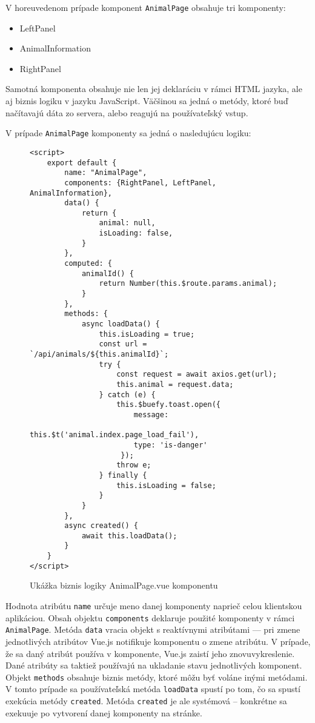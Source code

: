V horeuvedenom prípade komponent \texttt{AnimalPage} obsahuje tri komponenty:
\begin{itemize}
	\item LeftPanel
	\item AnimalInformation
	\item RightPanel
\end{itemize}

Samotná komponenta obsahuje nie len jej deklaráciu v rámci HTML jazyka, ale aj biznis logiku v jazyku JavaScript. Väčšinou sa jedná o metódy, ktoré buď načítavajú dáta zo servera, alebo reagujú na používateľský vstup.

V prípade \texttt{AnimalPage} komponenty sa jedná o nasledujúcu logiku:
\raggedbottom

\begin{figure}[H]
\begin{verbatim}
<script>
    export default {
        name: "AnimalPage",
        components: {RightPanel, LeftPanel, AnimalInformation},
        data() {
            return {
                animal: null,
                isLoading: false,
            }
        },
        computed: {
            animalId() {
                return Number(this.$route.params.animal);
            }
        },
        methods: {
            async loadData() {
                this.isLoading = true;
                const url = `/api/animals/${this.animalId}`;
                try {
                    const request = await axios.get(url);
                    this.animal = request.data;
                } catch (e) {
                    this.$buefy.toast.open({
                        message:
                        this.$t('animal.index.page_load_fail'),
                        type: 'is-danger' 
                     });
                    throw e;
                } finally {
                    this.isLoading = false;
                }
            }
        },
        async created() {
            await this.loadData();
        }
    }
</script>
\end{verbatim}
\caption[Ukážka biznis logiky AnimalPage.vue komponentu]
{Ukážka biznis logiky AnimalPage.vue komponentu}
\label{animal-page-business-code}
\end{figure}

Hodnota atribútu \texttt{name} určuje meno danej komponenty naprieč celou klientskou aplikáciou.
Obsah objektu \texttt{components} deklaruje použité komponenty v rámci \texttt{AnimalPage}.
Metóda \texttt{data} vracia objekt s reaktívnymi atribútami --- pri zmene jednotlivých atribútov Vue.js notifikuje komponentu o zmene atribútu. V prípade, že sa daný atribút používa v komponente, Vue.js zaistí jeho znovuvykreslenie.
Dané atribúty sa taktiež používajú na ukladanie stavu jednotlivých komponent.
Objekt \texttt{methods} obsahuje biznis metódy, ktoré môžu byť voláne inými metódami. V tomto prípade sa používateľská metóda \texttt{loadData} spustí po tom, čo sa spustí exekúcia metódy \texttt{created}. Metóda \texttt{created} je ale systémová -- konkrétne sa exekuuje po vytvorení danej komponenty na stránke.

